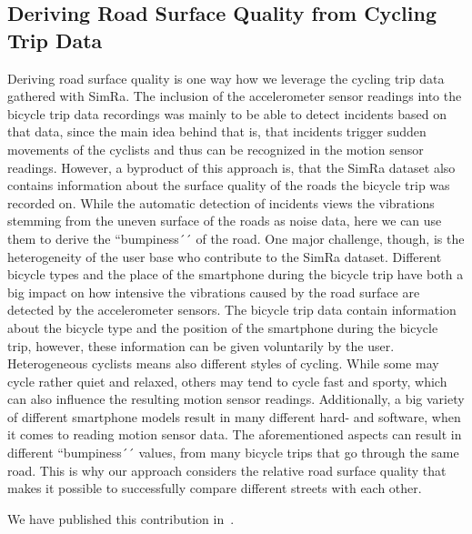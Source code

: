 \subsection{Deriving Road Surface Quality from Cycling Trip Data}
\label{subsec:road_surface_contribution}
Deriving road surface quality is one way how we leverage the cycling trip data gathered with SimRa.
The inclusion of the accelerometer sensor readings into the bicycle trip data recordings was mainly to be able to detect incidents based on that data, since the main idea behind that is, that incidents trigger sudden movements of the cyclists and thus can be recognized in the motion sensor readings.
However, a byproduct of this approach is, that the SimRa dataset also contains information about the surface quality of the roads the bicycle trip was recorded on.
While the automatic detection of incidents views the vibrations stemming from the uneven surface of the roads as noise data, here we can use them to derive the ``bumpiness´´ of the road.
One major challenge, though, is the heterogeneity  of the user base who contribute to the SimRa dataset.
Different bicycle types and the place of the smartphone during the bicycle trip have both a big impact on how intensive the vibrations caused by the road surface are detected by the accelerometer sensors.
The bicycle trip data contain information about the bicycle type and the position of the smartphone during the bicycle trip, however, these information can be given voluntarily by the user.
Heterogeneous cyclists means also different styles of cycling.
While some may cycle rather quiet and relaxed, others may tend to cycle fast and sporty, which can also influence the resulting motion sensor readings.
Additionally, a big variety of different smartphone models result in many different hard- and software, when it comes to reading motion sensor data.
The aforementioned aspects can result in different ``bumpiness´´ values, from many bicycle trips that go through the same road.
This is why our approach considers the relative road surface quality that makes it possible to successfully compare different streets with each other.

We have published this contribution in~\cite{karakaya2023crowdsensing}.

